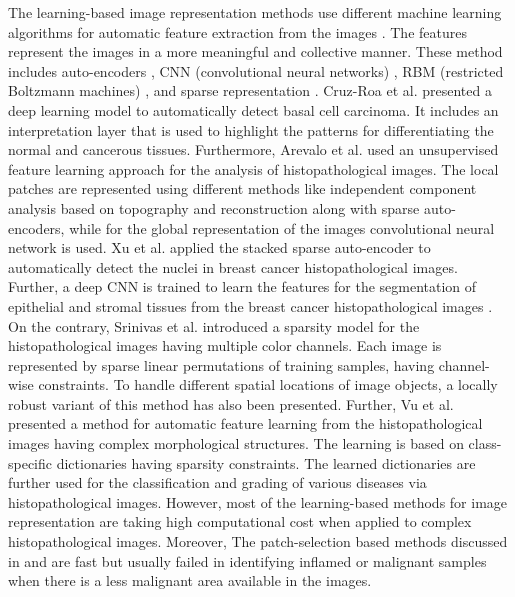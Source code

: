 The learning-based image representation methods use different machine learning algorithms for automatic feature extraction from the images \cite{zheng2017}. The features represent the images in a more meaningful and collective manner. These method includes auto-encoders \cite{arevalo2014},  CNN (convolutional  neural  networks) \cite{xu2016deep}, RBM (restricted  Boltzmann  machines) \cite{nayak2013}, and sparse  representation \cite{vu2016}. Cruz-Roa et al. \cite{Cruz-Roa2013} presented a deep learning model to automatically detect basal cell carcinoma. It includes an interpretation layer that is used to highlight the patterns for differentiating the normal and cancerous tissues. Furthermore, Arevalo et al. \cite{arevalo2015} used an unsupervised feature learning approach for the analysis of histopathological images. The local patches are represented using different methods like independent component analysis based on topography and reconstruction along with sparse auto-encoders, while for the global representation of the images convolutional neural network is used. Xu et al. \cite{xu2016} applied the stacked sparse auto-encoder to automatically detect the nuclei in breast cancer histopathological images. Further, a deep CNN is trained to learn the features for the segmentation of epithelial and stromal tissues from the breast cancer histopathological images \cite{xu2016deep}.  On the contrary, Srinivas et al. \cite{srinivas2014} introduced a sparsity model for the histopathological images having multiple color channels.  Each image is represented by sparse linear permutations of training samples, having channel-wise constraints. To handle different spatial locations of image objects, a locally robust variant of this method has also been presented.  Further, Vu et al. \cite{vu2016} presented a method for automatic feature learning from the histopathological images having complex morphological structures. The learning is based on class-specific dictionaries having sparsity constraints. The learned dictionaries are further used for the classification and grading of various diseases via histopathological images. However, most of the learning-based methods for image representation are taking high computational cost \cite{gutierrez2013} when applied to complex histopathological images.  Moreover, The patch-selection based methods discussed in \cite{srinivas2014} and \cite{vu2016} are fast but usually failed in identifying inflamed or malignant samples when there is a less malignant area available in the images.

